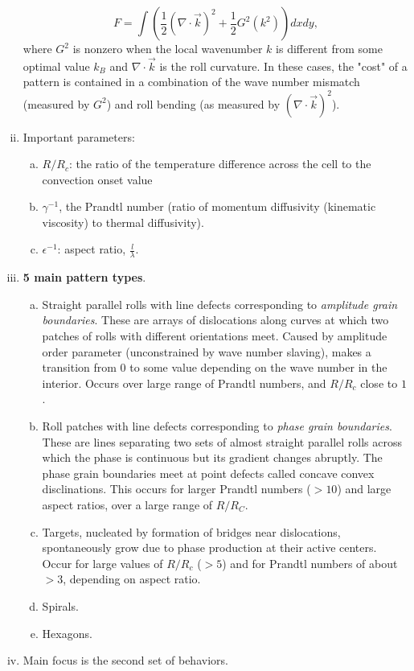 \documentclass[12pt]{article}
\begin{document}
\begin{enumerate}[(i)]
    \[
        F = \int \left( \frac{1}{2}(\nabla \cdot \vec{k})^2+\frac{1}{2}G^2(k^2) \right)dxdy,
    \] 
    where $G^2$ is nonzero when the local wavenumber $k$ is different from some optimal value $k_B$ and $\nabla \cdot \vec{k}$ is the roll curvature. In these cases, the "cost" of a pattern is contained in a combination of the wave number mismatch (measured by $G^2$) and roll bending (as measured by $(\nabla \cdot\vec{k})^2$).
\item Important parameters:
    \begin{enumerate}[(a)]
        \item $R/R_c$: the ratio of the temperature difference across the cell to the convection onset value
        \item $\gamma^{-1}$, the Prandtl number (ratio of momentum diffusivity (kinematic viscosity) to thermal diffusivity).
        \item $\epsilon^{-1}$: aspect ratio, $\frac{l}{\lambda}$.
    \end{enumerate}
\item \textbf{5 main pattern types}.
    \begin{enumerate}[(a)]
        \item Straight parallel rolls with line defects corresponding to \emph{amplitude grain boundaries}. These are arrays of dislocations along curves at which two patches of rolls with different orientations meet. Caused by amplitude order parameter (unconstrained by wave number slaving), makes a transition from $0$ to some value depending on the wave number in the interior. Occurs over large range of Prandtl numbers, and $R/R_c$ close to $1$.
        \item Roll patches with line defects corresponding to \emph{phase grain boundaries}. These are lines separating two sets of almost straight parallel rolls across which the phase is continuous but its gradient changes abruptly. The phase grain boundaries meet at point defects called concave convex disclinations. This occurs for larger Prandtl numbers ($>10$) and large aspect ratios, over a large range of $R/R_C$.
        \item Targets, nucleated by formation of bridges near dislocations, spontaneously grow due to phase production at their active centers. Occur for large values of $R/R_c$ ($>5$) and for Prandtl numbers of about $>3$, depending on aspect ratio.
        \item Spirals. 
        \item Hexagons.
    \end{enumerate}
\item Main focus is the second set of behaviors. 
\end{enumerate}
\end{document}
